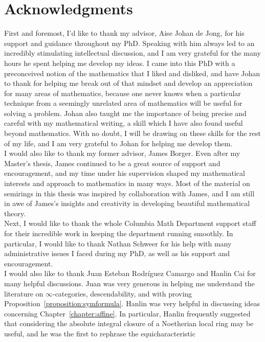 \chapter{Acknowledgments}

First and foremost, I'd like to thank my advisor, Aise Johan de Jong, for his support and guidance throughout my PhD. 
Speaking with him always led to an incredibly stimulating intellectual discussion, and I am very grateful for the many hours he spent helping me develop my ideas. 
I came into this PhD with a preconceived notion of the mathematics that I liked and disliked, 
and have Johan to thank for helping me break out of that mindset and develop an appreciation for many areas of mathematics,
 because one never knows when a particular technique from a seemingly unrelated area of mathematics will be useful for solving a problem.
Johan also taught me the importance of being precise and careful with my mathematical writing, a skill which I have also 
found useful beyond mathematics. With no doubt, I will be drawing on these skills for the rest of my life, and I am very grateful to Johan for helping me develop them.\\
\indent I would also like to thank my former advisor, James Borger. Even after my Master's thesis, James continued to be a great source of support and encouragement, 
and my time under his supervision shaped my mathematical interests and approach to mathematics in many ways. Most of the material on semirings in this thesis
was inspired by collaboration with James, and I am still in awe of James's insights and creativity in developing beautiful mathematical theory.\\
\indent Next, I would like to thank the whole Columbia Math Department support staff for their incredible work in keeping the department running smoothly. 
In particular, I would like to thank Nathan Schweer for his help with many administrative issues I faced during my PhD, as well as his support and encouragement.\\
\indent I would also like to thank Juan Esteban Rodríguez Camargo and Hanlin Cai for many helpful discussions. 
Juan was very generous in helping me understand the literature on $\infty$-categories, descendability, and with proving Proposition~\ref{proposition:symformula}. 
Hanlin was very helpful in discussing ideas concerning Chapter~\ref{chapter:affine}. In particular, Hanlin frequently suggested
that considering the absolute integral closure of a Noetherian local ring may be useful, and he was the first to rephrase the equicharacteristic 

